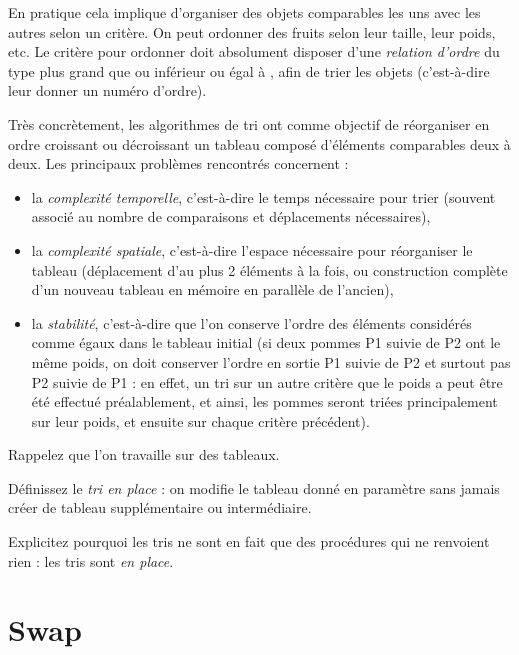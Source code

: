 \documentclass[11pt,a4paper]{article}
\begin{document}
\bigskip

En pratique cela implique d'organiser des objets comparables les uns avec les autres selon un critère.
On peut ordonner des fruits selon leur taille, leur poids, etc.
Le critère pour ordonner doit absolument disposer d'une \textit{relation d'ordre} du type \og plus grand que \fg{} ou \og inférieur ou égal à \fg{}, afin de trier les objets (c'est-à-dire leur donner un numéro d'ordre).

\bigskip

Très concrètement, les algorithmes de tri ont comme objectif de réorganiser en ordre croissant ou décroissant un tableau composé d'éléments comparables deux à deux.
Les principaux problèmes rencontrés concernent :
\begin{itemize}
\item la \textit{complexité temporelle}, c'est-à-dire le temps nécessaire pour trier (souvent associé au nombre de comparaisons et déplacements nécessaires),
\item la \textit{complexité spatiale}, c'est-à-dire l'espace nécessaire pour réorganiser le tableau (déplacement d'au plus 2 éléments à la fois, ou construction complète d'un nouveau tableau en mémoire en parallèle de l'ancien),
\item la \textit{stabilité}, c'est-à-dire que l'on conserve l'ordre des éléments considérés comme égaux dans le tableau initial (si deux pommes P1 suivie de P2 ont le même poids, on doit conserver l'ordre en sortie P1 suivie de P2 et surtout pas P2 suivie de P1 : en effet, un tri sur un autre critère que le poids a peut être été effectué préalablement, et ainsi, les pommes seront triées principalement sur leur poids, et ensuite sur chaque critère précédent).
\end{itemize}

\bigskip

Rappelez que l'on travaille sur des tableaux.

\medskip

Définissez le \textit{tri en place} : on modifie le tableau donné en paramètre sans jamais créer de tableau supplémentaire ou intermédiaire.

\smallskip

Explicitez pourquoi les tris ne sont en fait que des procédures qui ne renvoient rien : les tris sont \textit{en place}.


\bigskip


\section{Swap}
\end{document}
